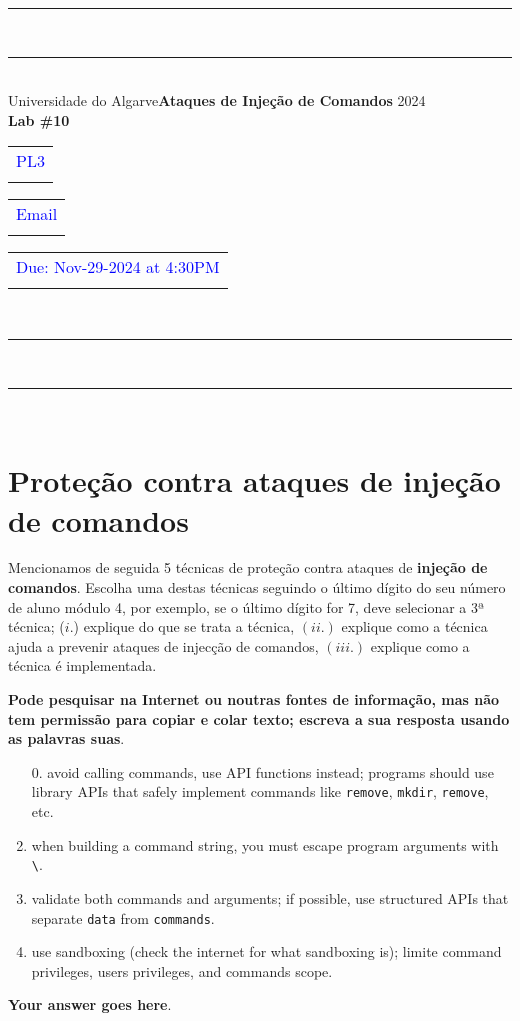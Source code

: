 \documentclass{article}
\begin{document}
\begin{center}
\rule{\textwidth}{.0075in} \\
\rule[3mm]{\textwidth}{.0075in}\\

Universidade do Algarve\hfill \textbf{Ataques de Injeção de Comandos} \hfill 2024\\[3ex]

{\Large\bf Lab \#10} \\[3ex]

\begin{tabular}{l}
\textcolor{blue}{PL3} \\ \hfill 
\end{tabular}
\begin{tabular}{l}
\textcolor{blue}{Email} \\ \hfill 
\end{tabular}
\begin{tabular}{l}
\textcolor{blue}{Due: Nov-29-2024 at 4:30PM} \\ \hfill 
\end{tabular}\\

\rule{\textwidth}{.0075in} \\
\rule[3mm]{\textwidth}{.0075in} \\
\end{center}

\section*{Proteção contra ataques de injeção de comandos}

Mencionamos de seguida 5 técnicas de proteção contra ataques de
\textbf{injeção de comandos}. Escolha uma destas técnicas seguindo o
último dígito do seu número de aluno módulo 4, por exemplo, se o
último dígito for 7, deve selecionar a 3ª técnica; ($i.$) explique do
que se trata a técnica, $(ii.)$ explique como a técnica ajuda a
prevenir ataques de injecção de comandos, $(iii.)$ explique como a
técnica é implementada.

\bigskip

{\large
  \noindent
\textbf{Pode pesquisar na Internet ou noutras fontes de informação, mas não
tem permissão para copiar e colar texto; escreva a sua resposta usando
as palavras suas}.
}

\bigskip

\begin{enumerate}
\item[0.] avoid calling commands, use API functions instead; programs
  should use library APIs that safely implement commands like
  \texttt{remove}, \texttt{mkdir}, \texttt{remove}, etc.
\item when building a command string, you must escape program
  arguments with \verb|\|.
\item validate both commands and arguments; if possible, use
  structured APIs that separate \texttt{data} from \texttt{commands}.
\item use sandboxing (check the internet for what sandboxing is); limite command
  privileges, users privileges, and commands scope.
\end{enumerate}

\bigskip 
\bigskip

\textbf{Your answer goes here}.
\end{document}
